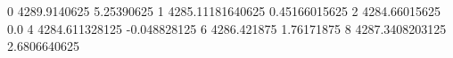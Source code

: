 0 4289.9140625 5.25390625
1 4285.11181640625 0.45166015625
2 4284.66015625 0.0
4 4284.611328125 -0.048828125
6 4286.421875 1.76171875
8 4287.3408203125 2.6806640625
